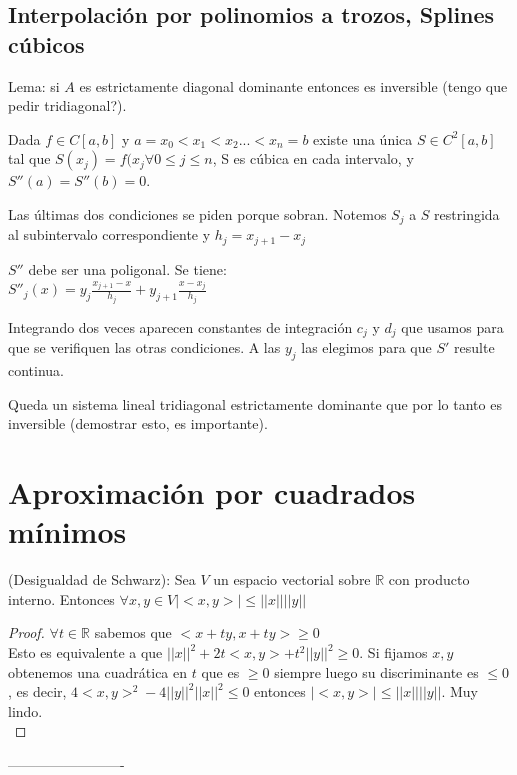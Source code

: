 \documentclass[10pt,a4paper,final]{report}
\begin{document}
\subsection{Interpolación por polinomios a trozos, Splines cúbicos}

Lema: si $A$ es estrictamente diagonal dominante entonces es inversible (tengo que pedir tridiagonal?).


\begin{theorem} Dada $f \in C[a,b]$ y $a = x_0 < x_1 < x_2 ... < x_n = b$ existe una única $S \in C^2[a,b]$ tal que $S(x_j)=f(x_j \forall 0\leq j \leq n$, S es cúbica en cada intervalo, y $S''(a) = S''(b)=0$.
\end{theorem}

Las últimas dos condiciones se piden porque sobran. Notemos $S_j$ a $S$ restringida al subintervalo correspondiente y $h_j = x_{j+1} - x_j$

$S''$ debe ser una poligonal. Se tiene:\\

$S''_j(x) = y_j \frac{x_{j+1}-x}{h_j}+ y_{j+1} \frac{x-x_j}{h_j}$

Integrando dos veces aparecen constantes de integración $c_j$ y $d_j$ que usamos para que se verifiquen las otras condiciones. A las $y_j$ las elegimos para que $S'$ resulte continua.

Queda un sistema lineal tridiagonal estrictamente dominante que por lo tanto es inversible (demostrar esto, es importante).


\section{Aproximación por cuadrados mínimos}

\begin{theorem} (Desigualdad de Schwarz): Sea $V$ un espacio vectorial sobre $\mathbb{R}$ con producto interno. Entonces $\forall x,y \in V |<x,y>| \leq ||x|| ||y||$\\
\end{theorem}


\begin{proof}$\forall t\in\mathbb{R}$ sabemos que $<x+ty,x+ty> \geq 0$\\

Esto es equivalente a que $||x||^2 + 2t<x,y> + t^2 ||y||^2 \geq 0$. Si fijamos $x,y$ obtenemos una cuadrática en $t$ que es $\geq 0$ siempre luego su discriminante es $\leq 0$, es decir, $4<x,y>^2 - 4 ||y||^2 ||x||^2 \leq 0$ entonces $|<x,y>| \leq ||x|| ||y||$. Muy lindo.\\
\end{proof}
-------------------------
\end{document}
